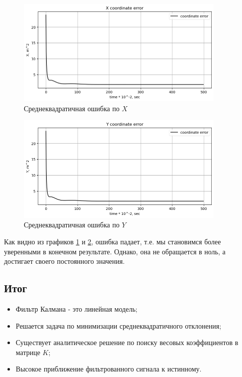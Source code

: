 \documentclass[a4paper,11pt]{article} %
\begin{document}
\begin{figure}[h!]
\begin{center}
\includegraphics[width=0.9\textwidth]{images/kalmanfilter4.png}
\end{center}
\caption{Среднеквадратичная ошибка по $X$} \label{kalman4}
\end{figure}

\begin{figure}[h!]
\begin{center}
\includegraphics[width=0.9\textwidth]{images/kalmanfilter5.png}
\end{center}
\caption{Среднеквадратичная ошибка по $Y$} \label{kalman5}
\end{figure}

\newpage
Как видно из графиков \ref{kalman4} и \ref{kalman5}, ошибка падает,  т.е.  мы становимся более уверенными в конечном результате. Однако,  она не обращается в ноль,  а достигает своего постоянного значения.

\newpage
\subsection{Итог}
\begin{itemize}
\item Фильтр Калмана - это линейная модель;
\item Решается задача по минимизации среднеквадратичного отклонения;
\item Существует аналитическое решение по поиску весовых коэффициентов в матрице $K$;
\item Высокое приближение фильтрованного сигнала к истинному.
\end{itemize}
\end{document}
